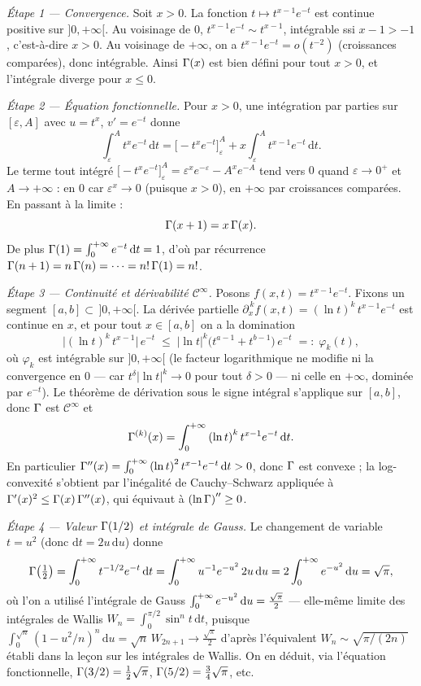 \begin{mdframed}[style=proofbar]
  \textit{Étape 1 — Convergence.}
  Soit $x>0$. La fonction $t\mapsto t^{x-1}e^{-t}$ est continue positive sur
  $]0,+\infty[$. Au voisinage de $0$, $t^{x-1}e^{-t}\sim t^{x-1}$, intégrable
  ssi $x-1>-1$, c'est-à-dire $x>0$. Au voisinage de $+\infty$, on a
  $t^{x-1}e^{-t}=o(t^{-2})$ (croissances comparées), donc intégrable. Ainsi
  $\Gamma(x)$ est bien défini pour tout $x>0$, et l'intégrale diverge pour
  $x\leq 0$.

  \medskip
  \textit{Étape 2 — Équation fonctionnelle.}
  Pour $x>0$, une intégration par parties sur $[\varepsilon,A]$ avec
  $u=t^{x}$, $v'=e^{-t}$ donne
  \[
    \int_\varepsilon^A t^{x}e^{-t}\,\mathrm{d}t
    = {\big[-t^{x}e^{-t}\big]}_\varepsilon^A
      + x\int_\varepsilon^A t^{x-1}e^{-t}\,\mathrm{d}t.
  \]
  Le terme tout intégré ${\big[-t^{x}e^{-t}\big]}_\varepsilon^A
  =\varepsilon^{x}e^{-\varepsilon}-A^{x}e^{-A}$ tend vers $0$ quand
  $\varepsilon\to 0^+$ et $A\to+\infty$ : en $0$ car $\varepsilon^{x}\to 0$
  (puisque $x>0$), en $+\infty$ par croissances comparées. En passant à la
  limite :
  \[
    \Gamma(x+1) = x\,\Gamma(x).
  \]
  De plus $\Gamma(1)=\int_0^{+\infty} e^{-t}\,\mathrm{d}t=1$, d'où par récurrence
  $\Gamma(n+1)=n\,\Gamma(n)=\dots=n!\,\Gamma(1)=n!$.

  \medskip
  \textit{Étape 3 — Continuité et dérivabilité $\mathcal{C}^\infty$.}
  Posons $f(x,t)=t^{x-1}e^{-t}$. Fixons un segment $[a,b]\subset\,]0,+\infty[$.
  La dérivée partielle $\partial_x^{\,k} f(x,t)={(\ln t)}^k\,t^{x-1}e^{-t}$ est
  continue en $x$, et pour tout $x\in[a,b]$ on a la domination
  \[
    \bigl|{(\ln t)}^k\,t^{x-1}\bigr|\,e^{-t}
    \;\leq\; {|\ln t|}^k\bigl(t^{a-1}+t^{b-1}\bigr)\,e^{-t}
    \;=:\;\varphi_k(t),
  \]
  où $\varphi_k$ est intégrable sur $]0,+\infty[$ (le facteur logarithmique ne
  modifie ni la convergence en $0$ — car $t^{\delta}{|\ln t|}^k\to 0$ pour tout
  $\delta>0$ — ni celle en $+\infty$, dominée par $e^{-t}$). Le théorème de
  dérivation sous le signe intégral s'applique sur $[a,b]$, donc $\Gamma$ est
  $\mathcal{C}^\infty$ et
  \[
    \Gamma^{(k)}(x) = \int_0^{+\infty} {(\ln t)}^k\,t^{x-1}e^{-t}\,\mathrm{d}t.
  \]
  En particulier $\Gamma''(x)=\int_0^{+\infty} {(\ln t)}^2\,t^{x-1}e^{-t}\,\mathrm{d}t>0$,
  donc $\Gamma$ est convexe ; la log-convexité s'obtient par l'inégalité de
  Cauchy--Schwarz appliquée à
  $\Gamma'(x)^2\leq\Gamma(x)\,\Gamma''(x)$, qui équivaut à
  ${(\ln\Gamma)}''\geq 0$.

  \medskip
  \textit{Étape 4 — Valeur $\Gamma(1/2)$ et intégrale de Gauss.}
  Le changement de variable $t=u^2$ (donc $\mathrm{d}t=2u\,\mathrm{d}u$) donne
  \[
    \Gamma\!\left(\tfrac12\right)
    = \int_0^{+\infty} t^{-1/2}e^{-t}\,\mathrm{d}t
    = \int_0^{+\infty} u^{-1}e^{-u^2}\,2u\,\mathrm{d}u
    = 2\int_0^{+\infty} e^{-u^2}\,\mathrm{d}u
    = \sqrt{\pi},
  \]
  où l'on a utilisé l'intégrale de Gauss $\int_0^{+\infty} e^{-u^2}\,\mathrm{d}u
  =\tfrac{\sqrt{\pi}}{2}$ — elle-même limite des intégrales de Wallis
  $W_n=\int_0^{\pi/2}\sin^n t\,\mathrm{d}t$, puisque
  $\int_0^{\sqrt{n}}{(1-u^2/n)}^n\,\mathrm{d}u=\sqrt{n}\,W_{2n+1}\to
  \tfrac{\sqrt{\pi}}{2}$ d'après l'équivalent $W_n\sim\sqrt{\pi/(2n)}$ établi
  dans la leçon sur les intégrales de Wallis. On en
  déduit, via l'équation fonctionnelle,
  $\Gamma(3/2)=\tfrac12\sqrt{\pi}$, $\Gamma(5/2)=\tfrac34\sqrt{\pi}$, etc.


\end{mdframed}

